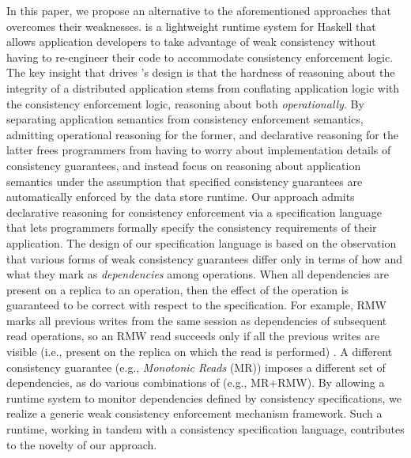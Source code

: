 In this paper, we propose an alternative to the aforementioned
approaches that overcomes their weaknesses.  \tool is a lightweight
runtime system for Haskell that allows application developers to take
advantage of weak consistency without having to re-engineer their code
to accommodate consistency enforcement logic.  The key insight that
drives \tool's design is that the hardness of reasoning about the
integrity of a distributed application stems from conflating
application logic with the consistency enforcement logic, reasoning
about both \emph{operationally}.  By separating application semantics
from consistency enforcement semantics, admitting operational
reasoning for the former, and declarative reasoning for the latter
frees programmers from having to worry about implementation details of
consistency guarantees, and instead focus on reasoning about
application semantics under the assumption that specified consistency
guarantees are automatically enforced by the data store runtime.  Our
approach admits declarative reasoning for consistency enforcement via
a specification language that lets programmers formally specify the
consistency requirements of their application. The design of our
specification language is based on the observation that various forms
of weak consistency guarantees differ only in terms of how and what
they mark as \emph{dependencies} among operations.  When all
dependencies are present on a replica to an operation, then the effect
of the operation is guaranteed to be correct with respect to the
specification.  For example, RMW marks all previous writes from the
same session as dependencies of subsequent read operations, so an RMW
read succeeds only if all the previous writes are visible (i.e.,
present on the replica on which the read is performed) . A different
consistency guarantee (e.g., \emph{Monotonic Reads} (MR)) imposes a
different set of dependencies, as do various combinations of (e.g.,
MR+RMW).  By allowing a runtime system to monitor dependencies defined
by consistency specifications, we realize a generic weak consistency
enforcement mechanism framework.  Such a runtime, working in tandem
with a consistency specification language, contributes to the novelty
of our approach.


